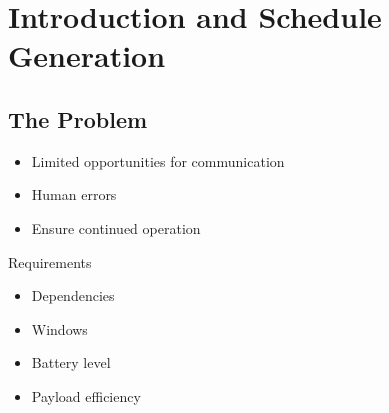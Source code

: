 \section{Introduction and Schedule Generation}
\subsection{The Problem}
\begin{frame}[fragile]{\insertsection}{\insertsubsection}
  \begin{itemize}
	\item Limited opportunities for communication 
	\item Human errors
	\item Ensure continued operation 
  \end{itemize}
\end{frame}

\begin{frame}[fragile]{Requirements}{\insertsubsection}
	\begin{itemize}
		\item Dependencies
		\item Windows
		\item Battery level
		\item Payload efficiency
	\end{itemize}
\end{frame}

